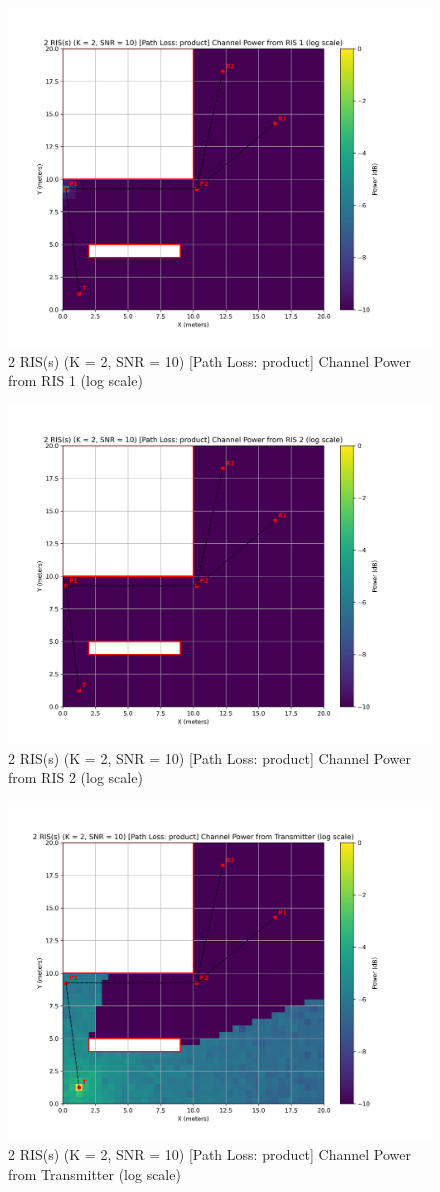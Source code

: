 \begin{figure}[H]
  \centering
  \includegraphics[width=0.45\linewidth]{imgs/heatmap-simulations/2 RIS(s) (K = 2, SNR = 10) [Path Loss_ product] Channel Power from RIS 1 (log scale).png}
  \caption{2 RIS(s) (K = 2, SNR = 10) [Path Loss: product] Channel Power from RIS 1 (log scale)}
\end{figure}

\begin{figure}[H]
  \centering
  \includegraphics[width=0.45\linewidth]{imgs/heatmap-simulations/2 RIS(s) (K = 2, SNR = 10) [Path Loss_ product] Channel Power from RIS 2 (log scale).png}
  \caption{2 RIS(s) (K = 2, SNR = 10) [Path Loss: product] Channel Power from RIS 2 (log scale)}
\end{figure}

\begin{figure}[H]
  \centering
  \includegraphics[width=0.45\linewidth]{imgs/heatmap-simulations/2 RIS(s) (K = 2, SNR = 10) [Path Loss_ product] Channel Power from Transmitter (log scale).png}
  \caption{2 RIS(s) (K = 2, SNR = 10) [Path Loss: product] Channel Power from Transmitter (log scale)}
\end{figure}

